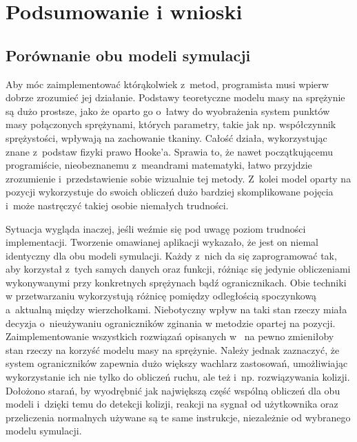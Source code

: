 \chapter{Podsumowanie i wnioski}
\label{t:wnioski}

	\section{Porównanie obu modeli symulacji}
	\label{t:wnioski:porownanie}
	
	
	Aby móc zaimplementować którąkolwiek z~metod, programista musi wpierw dobrze zrozumieć jej działanie. Podstawy teoretyczne modelu masy na sprężynie są dużo prostsze, jako że oparto go o~łatwy do wyobrażenia system punktów masy połączonych sprężynami, których parametry, takie jak np. współczynnik sprężystości, wpływają na zachowanie tkaniny. Całość działa, wykorzystując znane z~podstaw fizyki prawo Hooke'a. Sprawia to, że nawet początkującemu programiście, nieobeznanemu z~meandrami matematyki, łatwo przyjdzie zrozumienie i~przedstawienie sobie wizualnie tej metody. Z~kolei model oparty na pozycji wykorzystuje do swoich obliczeń dużo bardziej skomplikowane pojęcia i~może nastręczyć takiej osobie niemałych trudności.
	
	Sytuacja wygląda inaczej, jeśli weźmie się pod uwagę poziom trudności implementacji. Tworzenie omawianej aplikacji wykazało, że jest on niemal identyczny dla obu modeli symulacji. Każdy z~nich da się zaprogramować tak, aby korzystał z~tych samych danych oraz funkcji, różniąc się jedynie obliczeniami wykonywanymi przy konkretnych sprężynach bądź ogranicznikach. Obie techniki w przetwarzaniu wykorzystują różnicę pomiędzy odległością spoczynkową a~aktualną między wierzchołkami. Niebotyczny wpływ na taki stan rzeczy miała decyzja o~nieużywaniu ograniczników zginania w metodzie opartej na pozycji. Zaimplementowanie wszystkich rozwiązań opisanych w~\cite{posbased} na pewno zmieniłoby stan rzeczy na korzyść modelu masy na sprężynie. Należy jednak zaznaczyć, że system ograniczników zapewnia dużo większy wachlarz zastosowań, umożliwiając wykorzystanie ich nie tylko do obliczeń ruchu, ale też i~np. rozwiązywania kolizji. Dołożono starań, by wyodrębnić jak największą część wspólną obliczeń dla obu modeli i~dzięki temu do detekcji kolizji, reakcji na sygnał od użytkownika oraz przeliczenia normalnych używane są te same instrukcje, niezależnie od wybranego modelu symulacji.
	
